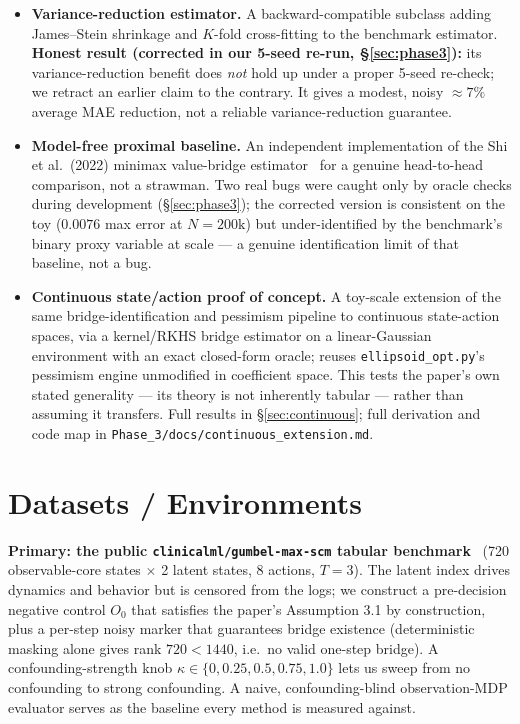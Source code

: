 \documentclass[11pt]{article}
\begin{document}
\begin{itemize}
  \item \textbf{Variance-reduction estimator.} A backward-compatible subclass adding
  James--Stein shrinkage and $K$-fold cross-fitting to the benchmark estimator.
  \textbf{Honest result (corrected in our 5-seed re-run, \S\ref{sec:phase3}):} its variance-reduction
  benefit does \emph{not} hold up under a proper 5-seed re-check; we retract an earlier
  claim to the contrary. It gives a modest, noisy $\approx 7\%$ average MAE reduction, not
  a reliable variance-reduction guarantee.
  \item \textbf{Model-free proximal baseline.} An independent implementation of the Shi et
  al.\ (2022) minimax value-bridge estimator~\cite{shi2022} for a genuine head-to-head
  comparison, not a strawman. Two real bugs were caught only by oracle checks during
  development (\S\ref{sec:phase3}); the corrected version is consistent on the toy
  ($0.0076$ max error at $N{=}200\mathrm{k}$) but under-identified by the benchmark's
  binary proxy variable at scale --- a genuine identification limit of that baseline, not a
  bug.
  \item \textbf{Continuous state/action proof of concept.} A toy-scale extension of the
  same bridge-identification and pessimism pipeline to continuous state-action spaces, via
  a kernel/RKHS bridge estimator on a linear-Gaussian environment with an exact
  closed-form oracle; reuses \texttt{ellipsoid\_opt.py}'s pessimism engine unmodified in
  coefficient space. This tests the paper's own stated generality --- its theory is not
  inherently tabular --- rather than assuming it transfers. Full results in
  \S\ref{sec:continuous}; full derivation and code map in
  \texttt{Phase\_3/docs/continuous\_extension.md}.
\end{itemize}

\section{Datasets / Environments}
\label{sec:envs}

\textbf{Primary: the public \texttt{clinicalml/gumbel-max-scm} tabular
benchmark}~\cite{oberst2019} (720 observable-core states $\times$ 2 latent states, 8
actions, $T{=}3$). The latent index drives dynamics and behavior but is censored from the
logs; we construct a pre-decision negative control $O_0$ that satisfies the paper's
Assumption 3.1 by construction, plus a per-step noisy marker that guarantees bridge
existence (deterministic masking alone gives rank $720<1440$, i.e.\ no valid one-step
bridge). A confounding-strength knob $\kappa \in \{0, 0.25, 0.5, 0.75, 1.0\}$ lets us sweep
from no confounding to strong confounding. A naive, confounding-blind observation-MDP
evaluator serves as the baseline every method is measured against.
\end{document}
